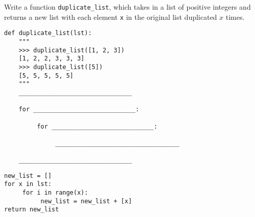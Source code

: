 \begin{blocksection}
\question Write a function \lstinline$duplicate_list$, which takes in a list of positive integers and returns a new list with each element \lstinline$x$ in the original list duplicated $x$ times.

\begin{lstlisting}
def duplicate_list(lst):
    """
    >>> duplicate_list([1, 2, 3])
    [1, 2, 2, 3, 3, 3]
    >>> duplicate_list([5])
    [5, 5, 5, 5, 5]
    """
    _______________________________
    
    for ____________________________:

         for ____________________________:

              __________________________________

    _______________________________

\end{lstlisting}

\begin{solution}
\begin{lstlisting}
new_list = []
for x in lst:
     for i in range(x):
          new_list = new_list + [x]
return new_list
\end{lstlisting}
\end{solution}
\end{blocksection}


